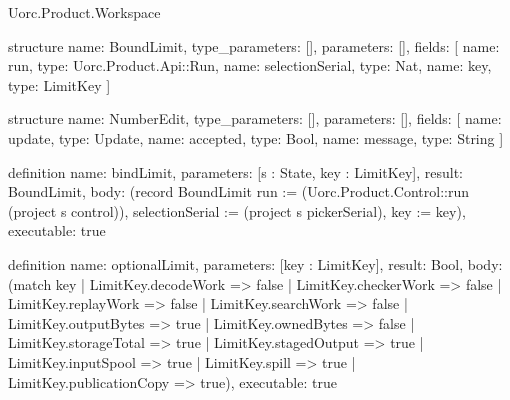 \begin{lexlean}{Uorc.Product.Workspace}
\begin{semanticmodule}
structure{
  name: BoundLimit,
  type_parameters: [],
  parameters: [],
  fields: [
    {name: run, type: Uorc.Product.Api::Run},
    {name: selectionSerial, type: Nat},
    {name: key, type: LimitKey}
  ]
}

structure{
  name: NumberEdit,
  type_parameters: [],
  parameters: [],
  fields: [
    {name: update, type: Update},
    {name: accepted, type: Bool},
    {name: message, type: String}
  ]
}

definition{
  name: bindLimit,
  parameters: [s : State, key : LimitKey],
  result: BoundLimit,
  body: (record BoundLimit {run := (Uorc.Product.Control::run (project s control)), selectionSerial := (project s pickerSerial), key := key}),
  executable: true
}

definition{
  name: optionalLimit,
  parameters: [key : LimitKey],
  result: Bool,
  body: (match key
    | LimitKey.decodeWork => false
    | LimitKey.checkerWork => false
    | LimitKey.replayWork => false
    | LimitKey.searchWork => false
    | LimitKey.outputBytes => true
    | LimitKey.ownedBytes => false
    | LimitKey.storageTotal => true
    | LimitKey.stagedOutput => true
    | LimitKey.inputSpool => true
    | LimitKey.spill => true
    | LimitKey.publicationCopy => true),
  executable: true
}


\end{semanticmodule}
\end{lexlean}
